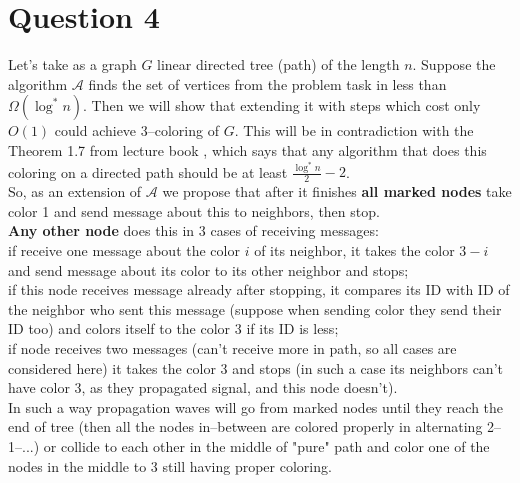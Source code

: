 \documentclass[]{article}
\title{}
\author{}
\begin{document}

\section*{Question 4}

	Let's take as a graph $G$ linear directed tree (path) of the length $n$. Suppose the algorithm $\mathcal{A}$ finds the set of vertices from the problem task in less than $\Omega(\log^* n)$. Then we will show that extending it with steps which cost only $O(1)$ could achieve 3--coloring of $G$. This will be in contradiction with the Theorem 1.7 from lecture book \cite{Ghaffari}, which says that any algorithm that does this coloring on a directed path should be at least $\frac{\log^*n}{2} - 2$.\\
	
	So, as an extension of $\mathcal{A}$ we propose that after it finishes \textbf{all marked nodes} take color 1 and send message about this to neighbors, then stop.\\
	
	 \textbf{Any other node} does this in 3 cases of receiving messages:\\
	 if receive one message about the color $i$ of its neighbor, it takes the color $3-i$ and send message about its color to its other neighbor and stops;\\
	 if this node receives message already after stopping, it compares its ID with ID of the neighbor who sent this message (suppose when sending color they send their ID too) and colors itself to the color 3 if its ID is less;\\
	 if node receives two messages (can't receive more in path, so all cases are considered here) it takes the color 3 and stops (in such a case its neighbors can't have color 3, as they propagated signal, and this node doesn't).\\
	 
	 In such a way propagation waves will go from marked nodes until they reach the end of tree (then all the nodes in--between are colored properly in alternating 2--1--...) or collide to each other in the middle of "pure" path and color one of the nodes in the middle to 3 still having proper coloring.
	 
\end{document}
